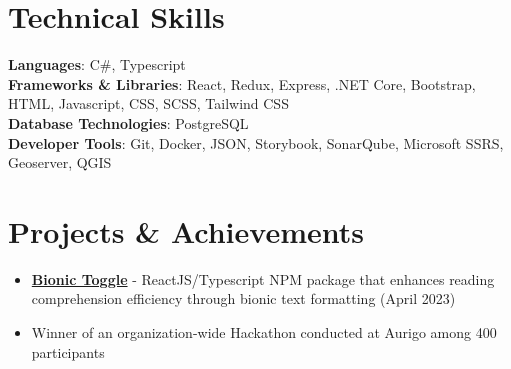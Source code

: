 \documentclass[a4paper,12pt]{article}
\newcommand{\resumeItem}[1]{
  \item\small{
    {#1 \vspace{-2pt}}
  }
}
\newcommand{\resumeSubHeadingListEnd}{\end{itemize}}
\newcommand{\resumeItemListStart}{\begin{itemize}}
\begin{document}
\vspace{-8pt}
\section{Technical Skills}
 \begin{itemize}[leftmargin=0.15in, label={}]
    \small{\item{
     \textbf{Languages}{: C\#, Typescript} \\
     \textbf{Frameworks \& Libraries}{: React, Redux, Express, .NET Core, Bootstrap, HTML, Javascript, CSS, SCSS, Tailwind CSS} \\
     \textbf{Database Technologies}{: PostgreSQL} \\
     \textbf{Developer Tools}{: Git, Docker, JSON, Storybook, SonarQube, Microsoft SSRS, Geoserver, QGIS}
    }}
 \end{itemize}

\vspace{-8pt}
\section{Projects \& Achievements}
    \resumeItemListStart
          \resumeItem{\textbf{\href{https://www.npmjs.com/package/bionictoggle}{Bionic Toggle}} - ReactJS/Typescript NPM package that enhances reading comprehension efficiency through bionic text formatting (April 2023)}

          \resumeItem{Winner of an organization-wide Hackathon conducted at Aurigo among 400 participants}
    \resumeSubHeadingListEnd
\end{document}
